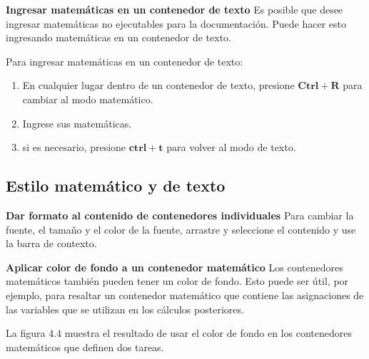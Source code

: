 
\textbf{Ingresar matemáticas en un contenedor de texto}
Es posible que desee ingresar matemáticas no ejecutables para la documentación. Puede hacer esto ingresando matemáticas en un contenedor de texto.

Para ingresar matemáticas en un contenedor de texto:

\begin{enumerate}
  \item En cualquier lugar dentro de un contenedor de texto, presione $\mathbf{C t r l}+\mathbf{R}$ para cambiar al modo matemático.
 
 \item Ingrese sus matemáticas.
  \item si es necesario, presione $\mathbf{c t r l}+\mathbf{t}$ para volver al modo de texto.
\end{enumerate}

\subsection{Estilo matemático y de texto}
\textbf{Dar formato al contenido de contenedores individuales}
Para cambiar la fuente, el tamaño y el color de la fuente, arrastre y seleccione el contenido y use la barra de contexto.

\textbf{Aplicar color de fondo a un contenedor matemático}
Los contenedores matemáticos también pueden tener un color de fondo. Esto puede ser útil, por ejemplo, para resaltar un contenedor matemático que contiene las asignaciones de las variables que se utilizan en los cálculos posteriores.









La figura 4.4 muestra el resultado de usar el color de fondo en los contenedores matemáticos que definen dos tareas.


